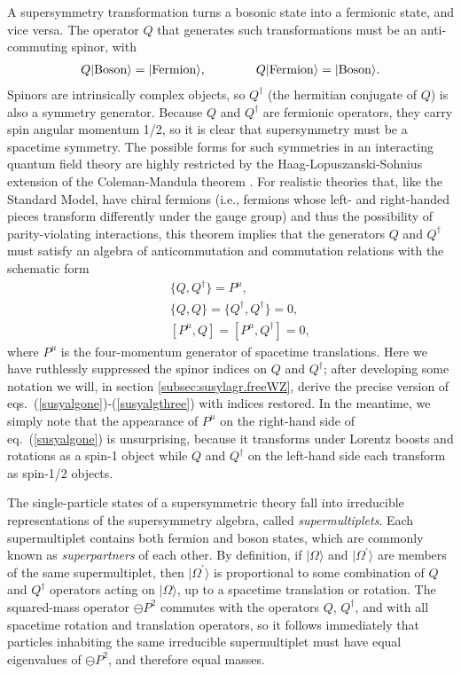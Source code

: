\documentclass[11pt]{article}
\def\BDpos{}
\def\BDpos{-}
\def\BDpos{\oplus}
\def\BDpos{\ominus}
\newcommand{\dagg}[1]{#1^\dagger}
\def\beq{\begin{eqnarray}}
\def\eeq{\end{eqnarray}}
\begin{document}
A supersymmetry transformation turns a bosonic state into a fermionic
state, and vice versa. The operator $Q$ that generates such
transformations must be an anti-commuting spinor, with
\beq
Q |{\rm Boson}\rangle = |{\rm Fermion }\rangle, \qquad\qquad
Q |{\rm Fermion}\rangle = |{\rm Boson }\rangle .
\eeq
Spinors are intrinsically complex objects, so $Q^\dagger$ (the hermitian
conjugate of $Q$) is also a symmetry generator. Because $Q$ and
$Q^\dagger$ are fermionic operators, they carry spin angular momentum 1/2,
so it is clear that supersymmetry must be a spacetime symmetry. The
possible forms for such symmetries in an interacting quantum field theory
are highly restricted by the Haag-Lopuszanski-Sohnius extension \cite{HLS} of the
Coleman-Mandula theorem \cite{ColemanMandula}. For realistic theories that, like the
Standard Model, have chiral fermions (i.e., fermions whose left- and
right-handed pieces transform differently under the gauge group) and thus
the possibility of parity-violating interactions, this theorem implies
that the generators $Q$ and $Q^\dagger$ must satisfy an algebra of
anticommutation and commutation relations with the schematic form
\beq
&&\{ Q, Q^\dagger \} = P^\mu , \label{susyalgone}
\\
&&\{ Q,Q \} = \{ Q^\dagger , Q^\dagger \} = 0 , \label{susyalgtwo}
\\
&&[ P^\mu , Q  ] = [P^\mu, Q^\dagger ] = 0 ,\label{susyalgthree}
\eeq
where $P^\mu$ is the four-momentum generator of spacetime translations.
Here we have ruthlessly suppressed the spinor indices on $Q$ and
$Q^\dagger$; after developing some notation we will, in section
\ref{subsec:susylagr.freeWZ}, derive the precise version of
eqs.~(\ref{susyalgone})-(\ref{susyalgthree}) with indices restored. In the
meantime, we simply note that the appearance of $P^\mu$ on the right-hand
side of eq.~(\ref{susyalgone}) is unsurprising, because it transforms under
Lorentz boosts and rotations as a spin-1 object while $Q$ and $Q^\dagger$
on the left-hand side each transform as spin-1/2 objects. 

The single-particle states of a supersymmetric theory fall into
irreducible representations of the supersymmetry algebra, called {\it
supermultiplets}. Each supermultiplet contains both fermion and boson
states, which are commonly known as {\it superpartners} of each other. By
definition, if $|\Omega\rangle$ and $|\Omega^\prime \rangle$ are members
of the same supermultiplet, then $|\Omega^\prime\rangle$ is proportional
to some combination of $Q$ and $\dagg{Q}$ operators acting on
$|\Omega\rangle $, up to a spacetime translation or rotation. The
squared-mass operator $\BDpos P^2$ commutes with the operators $Q$,
$\dagg{Q}$, and with all spacetime rotation and translation operators, so
it follows immediately that particles inhabiting the same irreducible
supermultiplet must have equal eigenvalues of $\BDpos P^2$, and therefore
equal masses. 
\end{document}
